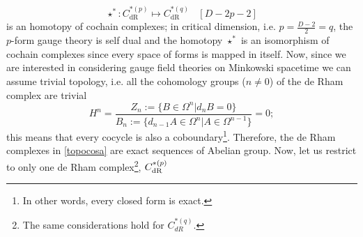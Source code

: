 \documentclass[a4paper,12pt]{article}
\begin{document}
\begin{equation}
    \star^{*} : C_{\text{dR}}^{*(p)} \mapsto C_{\text{dR}}^{*(q)} \ \ \ \ [D-2p-2]
\end{equation}
is an homotopy of cochain complexes; in critical dimension, i.e. $p=\frac{D-2}{2}=q$, the $p$-form gauge theory is self dual and the homotopy $\star^*$ is an isomorphism of cochain complexes since every space of forms is mapped in itself. Now, since we are interested in considering gauge field theories on Minkowski spacetime we can assume trivial topology, i.e. all the cohomology groups ($n \neq 0$) of the de Rham complex are trivial
\begin{equation}
    H^n=\frac{Z_n:=\{B\in \Omega^n | d_{n}B=0\}}{B_n:=\{d_{n-1}A \in \Omega^n | A \in \Omega^{n-1}\}}=0;
\end{equation}
this means that every cocycle is also a coboundary\footnote{In other words, every closed form is exact.}. Therefore, the de Rham complexes in \eqref{topocosa} are exact sequences of Abelian group. Now, let us restrict to only one de Rham complex\footnote{The same considerations hold for $C_{dR}^{*(q)}$.}, $C_{\textnormal{dR}}^{*(p)}$
\end{document}
